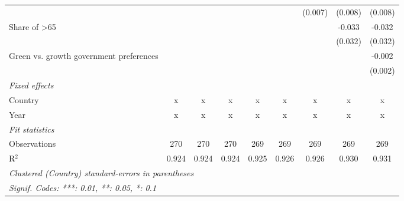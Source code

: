 \begin{table}[htbp]
\begin{tabular}{lcccccccc}
                                                     &         &         &         &         &         & (0.007) & (0.008) & (0.008)\\   
      Share of >65                                   &         &         &         &         &         &         & -0.033  & -0.032\\   
                                                     &         &         &         &         &         &         & (0.032) & (0.032)\\   
      Green vs. growth government preferences        &         &         &         &         &         &         &         & -0.002\\   
                                                     &         &         &         &         &         &         &         & (0.002)\\   
      \emph{Fixed effects}\\
      Country                                        & x       & x       & x       & x       & x       & x       & x       & x\\  
      Year                                           & x       & x       & x       & x       & x       & x       & x       & x\\  
      \midrule \emph{Fit statistics}\\
      Observations                                   & 270     & 270     & 270     & 269     & 269     & 269     & 269     & 269\\  
      R$^2$                                          & 0.924   & 0.924   & 0.924   & 0.925   & 0.926   & 0.926   & 0.930   & 0.931\\  
      \midrule
      \multicolumn{9}{l}{\emph{Clustered (Country) standard-errors in parentheses}}\\
      \multicolumn{9}{l}{\emph{Signif. Codes: ***: 0.01, **: 0.05, *: 0.1}}\\
   \end{tabular}
\end{table}


